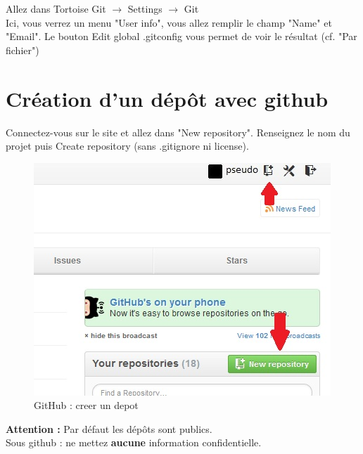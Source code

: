 Allez dans Tortoise Git $\rightarrow$ Settings $\rightarrow$ Git\\

Ici, vous verrez un menu "User info", vous allez remplir le champ "Name" et "Email".
Le bouton Edit global .gitconfig vous permet de voir le résultat (cf. "Par fichier")

\newpage
\section{Création d'un dépôt avec github}

Connectez-vous sur le site et allez dans "New repository".
Renseignez le nom du projet puis Create repository (sans .gitignore ni license).\\

\begin{figure}[h] 
	\begin{center}
		\includegraphics[scale=0.6]{../IMG/githubcreate.jpg}
	\end{center}
	\caption{GitHub : creer un depot}
	\label{GitHub : creer un depot} 
\end{figure}

\textbf{Attention :} Par défaut les dépôts sont publics.\\
Sous github : ne mettez \textbf{aucune} information confidentielle.